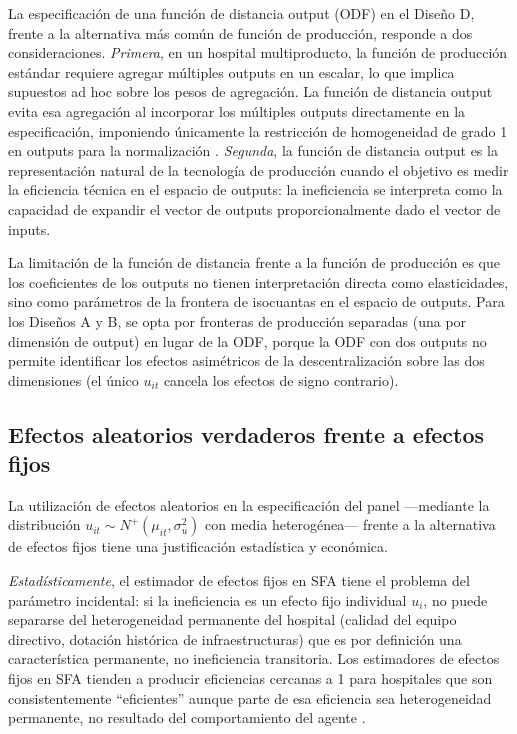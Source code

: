 La especificación de una función de distancia output (ODF) en el Diseño D, frente a la alternativa más común de función de producción, responde a dos consideraciones. \textit{Primera}, en un hospital multiproducto, la función de producción estándar requiere agregar múltiples outputs en un escalar, lo que implica supuestos ad hoc sobre los pesos de agregación. La función de distancia output evita esa agregación al incorporar los múltiples outputs directamente en la especificación, imponiendo únicamente la restricción de homogeneidad de grado 1 en outputs para la normalización \citep{coelli1999,grosskopf1987}. \textit{Segunda}, la función de distancia output es la representación natural de la tecnología de producción cuando el objetivo es medir la eficiencia técnica en el espacio de outputs: la ineficiencia se interpreta como la capacidad de expandir el vector de outputs proporcionalmente dado el vector de inputs.

La limitación de la función de distancia frente a la función de producción es que los coeficientes de los outputs no tienen interpretación directa como elasticidades, sino como parámetros de la frontera de isocuantas en el espacio de outputs. Para los Diseños A y B, se opta por fronteras de producción separadas (una por dimensión de output) en lugar de la ODF, porque la ODF con dos outputs no permite identificar los efectos asimétricos de la descentralización sobre las dos dimensiones (el único $u_{it}$ cancela los efectos de signo contrario).

\subsection{Efectos aleatorios verdaderos frente a efectos fijos}

La utilización de efectos aleatorios en la especificación del panel ---mediante la distribución $u_{it} \sim N^+(\mu_{it}, \sigma_u^2)$ con media heterogénea--- frente a la alternativa de efectos fijos tiene una justificación estadística y económica.

\textit{Estadísticamente}, el estimador de efectos fijos en SFA tiene el problema del parámetro incidental: si la ineficiencia es un efecto fijo individual $u_i$, no puede separarse del heterogeneidad permanente del hospital (calidad del equipo directivo, dotación histórica de infraestructuras) que es por definición una característica permanente, no ineficiencia transitoria. Los estimadores de efectos fijos en SFA tienden a producir eficiencias cercanas a 1 para hospitales que son consistentemente ``eficientes'' aunque parte de esa eficiencia sea heterogeneidad permanente, no resultado del comportamiento del agente \citep{greene2005a}.

